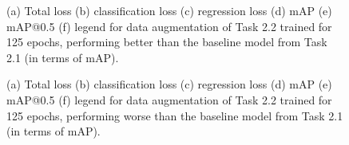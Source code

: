 \documentclass{article}
\begin{document}
\begin{figure}[t!]
    \centering
    \subfigure[]{}
    \vspace{-0.15cm}
    \subfigure[]{}
    \subfigure[]{}
    \subfigure[]{}
    \subfigure[]{}
    \vspace{-0.3cm}
    \caption{(a) Total loss (b) classification loss (c) regression loss (d) mAP (e) mAP@0.5 (f) legend for data augmentation of Task 2.2 trained for 125 epochs, performing better than the baseline model from Task 2.1 (in terms of mAP).}
    \label{fig:loss-2-2-better}
\end{figure}

\begin{figure}[t!]
    \centering
    \subfigure[]{}
    \vspace{-0.15cm}
    \subfigure[]{}
    \subfigure[]{}
    \subfigure[]{}
    \subfigure[]{}
    \vspace{-0.3cm}
    \caption{(a) Total loss (b) classification loss (c) regression loss (d) mAP (e) mAP@0.5 (f) legend for data augmentation of Task 2.2 trained for 125 epochs, performing worse than the baseline model from Task 2.1 (in terms of mAP).}
    \label{fig:loss-2-2-worse}
\end{figure}
\end{document}
